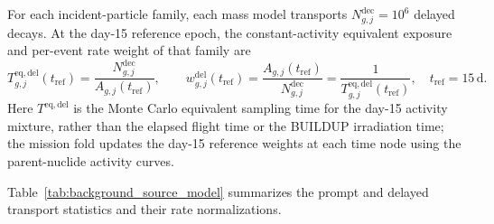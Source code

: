 \documentclass[11pt]{article}
\begin{document}
\begingroup

For each incident-particle family, each mass model
transports $N^{\mathrm{dec}}_{g,j}=10^6$ delayed decays. At the day-15 reference
epoch, the constant-activity equivalent exposure and per-event rate weight of
that family are
\begin{equation}
 T^{\mathrm{eq,del}}_{g,j}(t_{\mathrm{ref}})
 =\frac{N^{\mathrm{dec}}_{g,j}}{A_{g,j}(t_{\mathrm{ref}})},
 \qquad
 w^{\mathrm{del}}_{g,j}(t_{\mathrm{ref}})
 =\frac{A_{g,j}(t_{\mathrm{ref}})}{N^{\mathrm{dec}}_{g,j}}
 =\frac{1}{T^{\mathrm{eq,del}}_{g,j}(t_{\mathrm{ref}})},
 \quad t_{\mathrm{ref}}=15\,\mathrm{d}.
 \label{eq:delayed_equivalent_exposure}
\end{equation}
Here $T^{\mathrm{eq,del}}$ is the Monte Carlo equivalent sampling time for the
day-15 activity mixture, rather than the elapsed flight time or the BUILDUP
irradiation time; the mission fold updates the day-15 reference weights at each
time node using the parent-nuclide activity curves.
\endgroup

Table~\ref{tab:background_source_model} summarizes the prompt and delayed
transport statistics and their rate normalizations.

\begingroup
\end{document}
